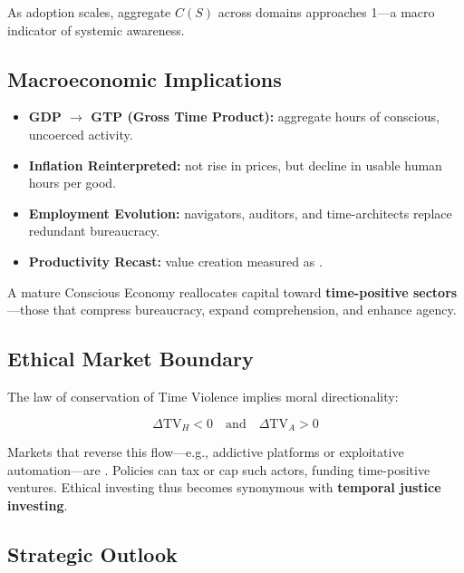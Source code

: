 As adoption scales, aggregate $C(S)$ across domains approaches 1—a macro indicator of systemic awareness.

\subsection{Macroeconomic Implications}
\label{sec:macro-implications}

\begin{itemize}
    \item \textbf{GDP $\to$ GTP (Gross Time Product):} aggregate hours of conscious, uncoerced activity.
    \item \textbf{Inflation Reinterpreted:} not rise in prices, but decline in usable human hours per good.
    \item \textbf{Employment Evolution:} navigators, auditors, and time-architects replace redundant bureaucracy.
    \item \textbf{Productivity Recast:} value creation measured as .
\end{itemize}

A mature Conscious Economy reallocates capital toward \textbf{time-positive sectors}—those that compress bureaucracy, expand comprehension, and enhance agency.

\subsection{Ethical Market Boundary}
\label{sec:ethical-boundary}

The law of conservation of Time Violence implies moral directionality:

\begin{equation}
\label{eq:ethical-flow}
\Delta \text{TV}_H < 0 \quad \text{and} \quad \Delta \text{TV}_A > 0
\end{equation}

Markets that reverse this flow—e.g., addictive platforms or exploitative automation—are . Policies can tax or cap such actors, funding time-positive ventures. Ethical investing thus becomes synonymous with \textbf{temporal justice investing}.

\subsection{Strategic Outlook}
\label{sec:strategic-outlook}

